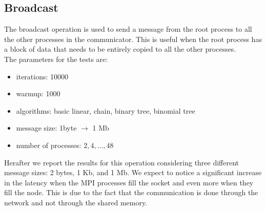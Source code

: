 \subsection{Broadcast}
    The broadcast operation is used to send a message from the root
    process to all the other processes in the communicator. 
    This is useful when the root process has a block of data that needs
    to be entirely copied to all the other processes. \\
    The parameters for the tests are:
    \begin{itemize}
        \item iterations: 10000
        \item warmup: 1000
        \item algorithms: basic linear, chain, binary tree, binomial tree
        \item message size: 1byte $\rightarrow$ 1 Mb
        \item number of processes: $2, 4, \dots, 48$
    \end{itemize}
    Herafter we report the results for this operation considering three
    different message sizes: 2 bytes, 1 Kb, and 1 Mb. We expect to notice
    a significant increase in the latency when the MPI processes fill
    the socket and even more when they fill the node. This is due to the
    fact that the communication is done through the network and not through
    the shared memory.
